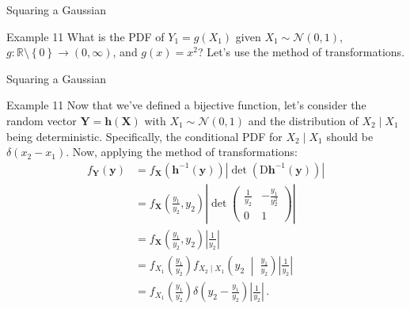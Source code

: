\documentclass[10pt]{beamer}
\begin{document}
\begin{frame}[fragile]{Squaring a Gaussian}
\begin{exampleblock}{Example 11}
What is the PDF of \(Y_1 = g\left(X_1\right)\) given \(X_1\sim\mathcal{N}\left(0, 1\right)\), \(g: \mathbb{R} \setminus \left\{0\right\}\rightarrow\left(0,\infty\right)\), and \(g\left(x\right) = x^2\)? Let's use the method of transformations.
\end{exampleblock}
\end{frame}

\begin{frame}[fragile]{Squaring a Gaussian}
\begin{exampleblock}{Example 11}
Now that we've defined a bijective function, let's consider the random vector \(\bm{Y} = \bm{h}\left(\bm{X}\right)\) with \(X_1\sim\mathcal{N}\left(0, 1\right)\) and the distribution of \(X_2\mid X_1\) being deterministic. Specifically, the conditional PDF for \(X_2\mid X_1\) should be \(\delta\left(x_2 - x_1\right)\). Now, applying the method of transformations:
\begin{equation*}
    \begin{aligned}
        f_{\bm{Y}}\left(\bm{y}\right) &= f_{\bm{X}}\left(\bm{h}^{-1}\left(\bm{y}\right)\right)\left|\det\left(\mathrm{D}\bm{h}^{-1}\left(\bm{y}\right)\right)\right|\\
        &= f_{\bm{X}}\left(\frac{y_1}{y_2}, y_2\right)\left|\det\begin{pmatrix}
            \frac{1}{y_2} & -\frac{y_1}{y_2^2}\\
            0 & 1
        \end{pmatrix}\right|\\
        &= f_{\bm{X}}\left(\frac{y_1}{y_2}, y_2\right)\left|\frac{1}{y_2}\right|\\
        &= f_{X_1}\left(\frac{y_1}{y_2}\right)f_{X_2\mid X_1}\left(y_2\;\middle|\;\frac{y_1}{y_2}\right)\left|\frac{1}{y_2}\right|\\
        &= f_{X_1}\left(\frac{y_1}{y_2}\right)\delta\left(y_2 - \frac{y_1}{y_2}\right)\left|\frac{1}{y_2}\right|\,.
    \end{aligned}
\end{equation*}
\end{exampleblock}
\end{frame}
\end{document}
